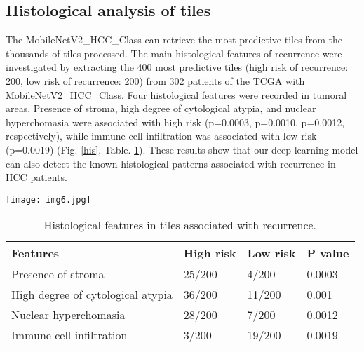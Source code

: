 \documentclass{article}
\begin{document}
\subsection{Histological analysis of tiles}
The MobileNetV2\_HCC\_Class can retrieve the most predictive tiles from the thousands of tiles processed. The main histological features of recurrence were investigated by extracting the 400 most predictive tiles (high risk of recurrence: 200, low risk of recurrence: 200) from 302 patients of the TCGA with MobileNetV2\_HCC\_Class. Four histological features were recorded in tumoral areas. Presence of stroma, high degree of cytological atypia, and nuclear hyperchomasia were associated with high risk (p=0.0003, p=0.0010, p=0.0012, respectively), while immune cell infiltration was associated with low risk (p=0.0019) (Fig. \ref{his}, Table. \ref{tab_his}). These results show that our deep learning model can also detect the known histological patterns associated with recurrence in HCC patients.



\begin{figure*}[h]
	\centerline{\texttt{[image: img6.jpg]}}
	\caption{ Typical tiles of classified as low or high risk by MobileNetV2\_HCC\_Class. 400 most predictive tiles were analyzed. The features predictive of a high risk of recurrence included stroma (A), cellular atypia (B), and nuclear hyperchomasia (C). The feature predictive of a low risk of recurrence included the presence of immune cells (D).}
	\label{his}
\end{figure*}

\begin{table}[h]
	\centering
	\begin{tabular}{|l|l|l|l|}
		\hline
		Features                          & High risk & Low risk & P value \\ \hline
		Presence of stroma                & 25/200    & 4/200    & 0.0003  \\ \hline
		High degree of cytological atypia & 36/200    & 11/200   & 0.001   \\ \hline
		Nuclear hyperchomasia             & 28/200    & 7/200    & 0.0012  \\ \hline
		Immune cell infiltration          & 3/200     & 19/200   & 0.0019  \\ \hline
	\end{tabular}
	\caption{Histological features in tiles associated with recurrence.}
	\label{tab_his}
\end{table}
\end{document}
